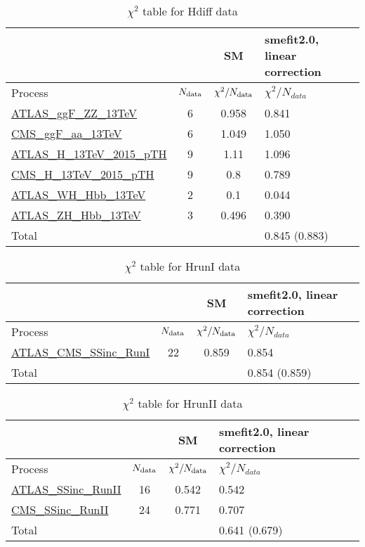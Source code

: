 \documentclass{article}
\begin{document}
\begin{table}[H]
\centering
\begin{tabular}{|l|c|c|C{3cm}|}
\hline
  & SM& smefit2.0, linear correction\\ \hline
Process & $N_{\rm data}$ & $\chi^ 2/N_{\rm data}$& $\chi^ 2/N_{data}$\\ \hline
\href{https://arxiv.org/abs/1909.02845}{ATLAS_ggF_ZZ_13TeV} & 6 & 0.958 & {\color{black} 0.841} \\ \hline
\href{https://inspirehep.net/literature/1725274}{CMS_ggF_aa_13TeV} & 6 & 1.049 & {\color{black} 1.050} \\ \hline
\href{https://inspirehep.net/literature/1743896}{ATLAS_H_13TeV_2015_pTH} & 9 & 1.11 & {\color{black} 1.096} \\ \hline
\href{https://arxiv.org/abs/1812.06504}{CMS_H_13TeV_2015_pTH} & 9 & 0.8 & {\color{black} 0.789} \\ \hline
\href{https://arxiv.org/abs/1903.04618}{ATLAS_WH_Hbb_13TeV} & 2 & 0.1 & {\color{black} 0.044} \\ \hline
\href{https://arxiv.org/abs/1903.04618}{ATLAS_ZH_Hbb_13TeV} & 3 & 0.496 & {\color{black} 0.390} \\ \hline
\hline Total & &  & 0.845 (0.883) \\ \hline
\end{tabular}
\caption{$\chi^2$ table for Hdiff data}
\end{table}
\begin{table}[H]
\centering
\begin{tabular}{|l|c|c|C{3cm}|}
\hline
  & SM& smefit2.0, linear correction\\ \hline
Process & $N_{\rm data}$ & $\chi^ 2/N_{\rm data}$& $\chi^ 2/N_{data}$\\ \hline
\href{https://arxiv.org/abs/1606.02266}{ATLAS_CMS_SSinc_RunI} & 22 & 0.859 & {\color{black} 0.854} \\ \hline
\hline Total & &  & 0.854 (0.859) \\ \hline
\end{tabular}
\caption{$\chi^2$ table for HrunI data}
\end{table}
\begin{table}[H]
\centering
\begin{tabular}{|l|c|c|C{3cm}|}
\hline
  & SM& smefit2.0, linear correction\\ \hline
Process & $N_{\rm data}$ & $\chi^ 2/N_{\rm data}$& $\chi^ 2/N_{data}$\\ \hline
\href{https://arxiv.org/abs/1909.02845}{ATLAS_SSinc_RunII} & 16 & 0.542 & {\color{black} 0.542} \\ \hline
\href{https://arxiv.org/abs/1809.10733}{CMS_SSinc_RunII} & 24 & 0.771 & {\color{black} 0.707} \\ \hline
\hline Total & &  & 0.641 (0.679) \\ \hline
\end{tabular}
\caption{$\chi^2$ table for HrunII data}
\end{table}
\end{document}
